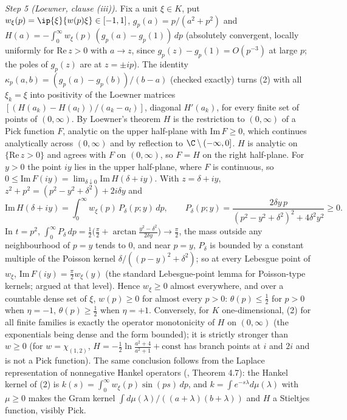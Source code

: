 \emph{Step 5 (Loewner, clause (iii)).} Fix a unit $\xi \in K$, put $w_{\xi}(p) = \ip{\xi}{w(p)\xi} \in [-1, 1]$, $g_{p}(a) = p/(a^{2} + p^{2})$ and $H(a) = -\int_{0}^{\infty}w_{\xi}(p)\,(g_{p}(a) - g_{p}(1))\,dp$ (absolutely convergent, locally uniformly for $\mathrm{Re}\,z > 0$ with $a \to z$, since $g_{p}(z) - g_{p}(1) = O(p^{-3})$ at large $p$; the poles of $g_{p}(z)$ are at $z = \pm ip$). The identity $\kappa_{p}(a, b) = (g_{p}(a) - g_{p}(b))/(b - a)$ (checked exactly) turns (2) with all $\xi_{k} = \xi$ into positivity of the Loewner matrices $[(H(a_{k}) - H(a_{l}))/(a_{k} - a_{l})]$, diagonal $H'(a_{k})$, for every finite set of points of $(0, \infty)$. By Loewner's theorem \cite{Loewner1934} $H$ is the restriction to $(0, \infty)$ of a Pick function $F$, analytic on the upper half-plane with $\mathrm{Im}\,F \ge 0$, which continues analytically across $(0, \infty)$ and by reflection to $\C\setminus(-\infty, 0]$. $H$ is analytic on $\{\mathrm{Re}\,z > 0\}$ and agrees with $F$ on $(0, \infty)$, so $F = H$ on the right half-plane. For $y > 0$ the point $iy$ lies in the upper half-plane, where $F$ is continuous, so $0 \le \mathrm{Im}\,F(iy) = \lim_{\delta\downarrow 0}\mathrm{Im}\,H(\delta + iy)$. With $z = \delta + iy$, $z^{2} + p^{2} = (p^{2} - y^{2} + \delta^{2}) + 2i\delta y$ and
\[ \mathrm{Im}\,H(\delta + iy) = \int_{0}^{\infty}w_{\xi}(p)\,P_{\delta}(p; y)\,dp, \qquad P_{\delta}(p; y) = \frac{2\delta y\,p}{(p^{2} - y^{2} + \delta^{2})^{2} + 4\delta^{2}y^{2}} \ge 0. \]
In $t = p^{2}$, $\int_{0}^{\infty}P_{\delta}\,dp = \tfrac12\big(\tfrac{\pi}{2} + \arctan\tfrac{y^{2} - \delta^{2}}{2\delta y}\big) \to \tfrac{\pi}{2}$, the mass outside any neighbourhood of $p = y$ tends to $0$, and near $p = y$, $P_{\delta}$ is bounded by a constant multiple of the Poisson kernel $\delta/((p - y)^{2} + \delta^{2})$; so at every Lebesgue point of $w_{\xi}$, $\mathrm{Im}\,F(iy) = \tfrac{\pi}{2}w_{\xi}(y)$ (the standard Lebesgue-point lemma for Poisson-type kernels; argued at that level). Hence $w_{\xi} \ge 0$ almost everywhere, and over a countable dense set of $\xi$, $w(p) \ge 0$ for almost every $p > 0$: $\theta(p) \le \tfrac12$ for $p > 0$ when $\eta = -1$, $\theta(p) \ge \tfrac12$ when $\eta = +1$. Conversely, for $K$ one-dimensional, (2) for all finite families is exactly the operator monotonicity of $H$ on $(0, \infty)$ (the exponentials being dense and the form bounded); it is strictly stronger than $w \ge 0$ (for $w = \chi_{(1, 2)}$, $H = -\tfrac12\ln\frac{a^{2} + 4}{a^{2} + 1} + \mathrm{const}$ has branch points at $i$ and $2i$ and is not a Pick function). The same conclusion follows from the Laplace representation of nonnegative Hankel operators (\cite{Yafaev2015}, Theorem 4.7): the Hankel kernel of (2) is $k(s) = \int_{0}^{\infty}w_{\xi}(p)\sin(ps)\,dp$, and $k = \int e^{-s\lambda}d\mu(\lambda)$ with $\mu \ge 0$ makes the Gram kernel $\int d\mu(\lambda)/((a + \lambda)(b + \lambda))$ and $H$ a Stieltjes function, visibly Pick.

